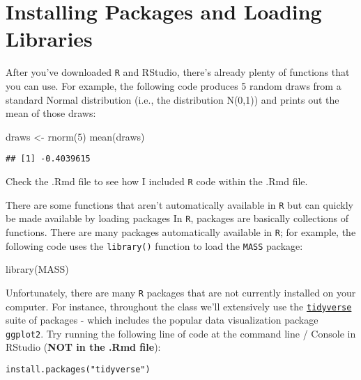 \documentclass[
]{article}
\newenvironment{Shaded}{\begin{snugshade}}{\end{snugshade}}
\newcommand{\DecValTok}[1]{\textcolor[rgb]{0.00,0.00,0.81}{#1}}
\newcommand{\FunctionTok}[1]{\textcolor[rgb]{0.00,0.00,0.00}{#1}}
\newcommand{\NormalTok}[1]{#1}
\newcommand{\OtherTok}[1]{\textcolor[rgb]{0.56,0.35,0.01}{#1}}
\begin{document}
\hypertarget{installing-packages-and-loading-libraries}{%
\section{Installing Packages and Loading
Libraries}\label{installing-packages-and-loading-libraries}}

After you've downloaded \texttt{R} and RStudio, there's already plenty
of functions that you can use. For example, the following code produces
5 random draws from a standard Normal distribution (i.e., the
distribution N(0,1)) and prints out the mean of those draws:

\begin{Shaded}
\begin{Highlighting}[]
\NormalTok{draws }\OtherTok{\textless{}{-}} \FunctionTok{rnorm}\NormalTok{(}\DecValTok{5}\NormalTok{)}
\FunctionTok{mean}\NormalTok{(draws)}
\end{Highlighting}
\end{Shaded}

\begin{verbatim}
## [1] -0.4039615
\end{verbatim}

Check the .Rmd file to see how I included \texttt{R} code within the
.Rmd file.

There are some functions that aren't automatically available in
\texttt{R} but can quickly be made available by loading packages In
\texttt{R}, packages are basically collections of functions. There are
many packages automatically available in \texttt{R}; for example, the
following code uses the \texttt{library()} function to load the
\texttt{MASS} package:

\begin{Shaded}
\begin{Highlighting}[]
\FunctionTok{library}\NormalTok{(MASS)}
\end{Highlighting}
\end{Shaded}

Unfortunately, there are many \texttt{R} packages that are not currently
installed on your computer. For instance, throughout the class we'll
extensively use the
\href{https://www.tidyverse.org/}{\texttt{tidyverse}} suite of packages
- which includes the popular data visualization package
\texttt{ggplot2}. Try running the following line of code at the command
line / Console in RStudio (\textbf{NOT in the .Rmd file}):

\texttt{install.packages("tidyverse")}
\end{document}
